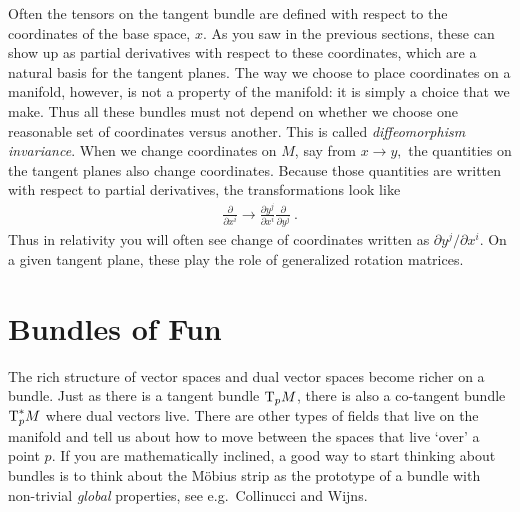 \documentclass[12pt, oneside]{report}    %
\let\oldsection\section
\def\section{%
  \setcounter{sidenote}{1}%
  \oldsection
}
\begin{document}
Often the tensors on the tangent bundle are defined with respect to the coordinates of the base space, $x$. As you saw in the previous sections, these can show up as partial derivatives with respect to these coordinates, which are a natural basis for the tangent planes. The way we choose to place coordinates on a manifold, however, is not a property of the manifold: it is simply a choice that we make. Thus all these bundles must not depend on whether we choose one reasonable set of coordinates versus another. This is called \emph{diffeomorphism invariance}. When we change coordinates on $M$, say from $x\to y,$ the quantities on the tangent planes also change coordinates. Because those quantities are written with respect to partial derivatives, the transformations look like
\begin{align}
    \frac{\partial}{\partial x^i} \to 
    \frac{\partial y^j}{\partial x^i} 
    \frac{\partial}{\partial y^j}  \ .
\end{align}
Thus in relativity you will often see change of coordinates written as ${\partial y^j}/{\partial x^i}$. On a given tangent plane, these play the role of generalized rotation matrices.




\section{Bundles of Fun}

The rich structure of vector spaces and dual vector spaces become richer on a bundle. Just as there is a tangent bundle $\textnormal{T}_pM$, there is also a co-tangent bundle $\textnormal{T}^*_pM$ where dual vectors live. There are other types of fields that live on the manifold and tell us about how to move between the spaces that live `over' a point $p$. If you are mathematically inclined, a good way to start thinking about bundles is to think about the M\"obius strip as the prototype of a bundle with non-trivial \emph{global} properties, see e.g.\ Collinucci and Wijns\autocite{Collinucci:2006hx}.
\end{document}

